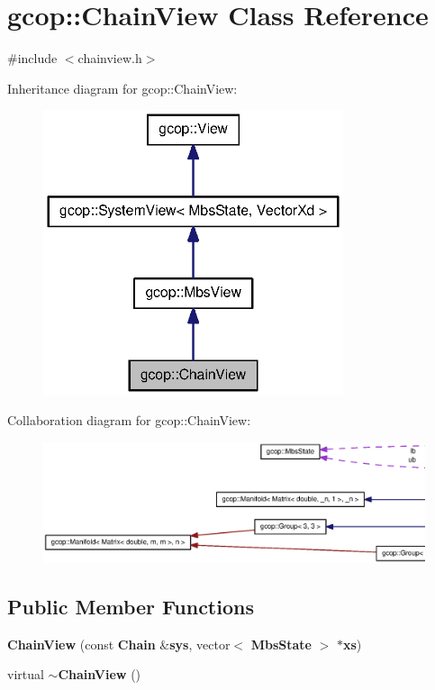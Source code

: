 \section{gcop\-:\-:\-Chain\-View \-Class \-Reference}
\label{classgcop_1_1ChainView}


{\ttfamily \#include $<$chainview.\-h$>$}



\-Inheritance diagram for gcop\-:\-:\-Chain\-View\-:\nopagebreak
\begin{figure}[H]
\begin{center}
\leavevmode
\includegraphics[width=250pt]{classgcop_1_1ChainView__inherit__graph}
\end{center}
\end{figure}


\-Collaboration diagram for gcop\-:\-:\-Chain\-View\-:\nopagebreak
\begin{figure}[H]
\begin{center}
\leavevmode
\includegraphics[width=350pt]{classgcop_1_1ChainView__coll__graph}
\end{center}
\end{figure}
\subsection*{\-Public \-Member \-Functions}
\begin{DoxyCompactItemize}
\item 
{\bf \-Chain\-View} (const {\bf \-Chain} \&{\bf sys}, vector$<$ {\bf \-Mbs\-State} $>$ $\ast${\bf xs})
\item 
virtual {\bf $\sim$\-Chain\-View} ()
\end{DoxyCompactItemize}
